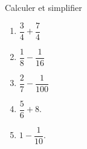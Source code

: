 
\begin{exercice}\label{exosmath-0838}

    Calculer et simplifier
\begin{multicols}{3}
    \begin{enumerate}
        \item
            \( \dfrac{ 3 }{ 4 }+\dfrac{ 7 }{ 4 }\)
        \item
            \( \dfrac{ 1 }{ 8 }-\dfrac{ 1 }{ 16 }\)
        \item
            \( \dfrac{ 2 }{ 7 }-\dfrac{ 1 }{ 100 }\)
        \item
            \( \dfrac{ 5 }{ 6 }+8\).
        \item
            \( 1-\dfrac{1}{ 10 }\).
    \end{enumerate}
\end{multicols}

\end{exercice}
